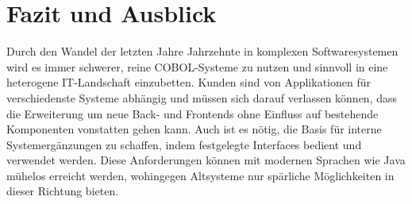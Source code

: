 \section{Fazit und Ausblick}

Durch den Wandel der letzten Jahre \bzw Jahrzehnte in komplexen Softwaresystemen wird es immer schwerer, reine COBOL-Systeme zu nutzen und sinnvoll in eine heterogene IT-Landschaft einzubetten. Kunden sind von Applikationen für verschiedenste Systeme abhängig und müssen sich darauf verlassen können, dass die Erweiterung um neue Back- und Frontends ohne Einfluss auf bestehende Komponenten vonstatten gehen kann. Auch ist es nötig, die Basis für interne Systemergänzungen zu schaffen, indem festgelegte Interfaces bedient und verwendet werden. Diese Anforderungen können mit modernen Sprachen wie Java mühelos erreicht werden, wohingegen Altsysteme nur spärliche Möglichkeiten in dieser Richtung bieten.




